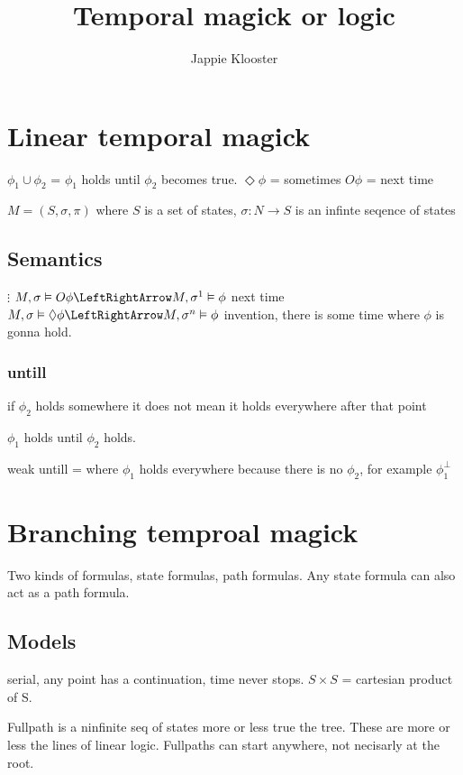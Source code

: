 \documentclass{article}
\begin{document}
\author{Jappie Klooster}
\title{Temporal magick or logic}
\maketitle
\section{Linear temporal magick}

$\phi_1\cup\phi_2$ = $\phi_1$ holds until $\phi_2$ becomes true.
$\Diamond\phi$ = sometimes
$O\phi$ = next time

$M=(S,\sigma, \pi)$ where $S$ is a set of states, $\sigma: N \to S$ is an
infinte seqence of states

\subsection{Semantics}
$\vdots$
$M,\sigma\vDash O\phi \LeftRightArrow M, \sigma^1 \vDash \phi$ next time
$M,\sigma\vDash \Diamond\phi \LeftRightArrow M, \sigma^n \vDash \phi$
invention, there is some time where $\phi$ is gonna hold.

\subsubsection{untill}
if $\phi_2$ holds somewhere it does not mean it holds everywhere after that
point

$\phi_1$ holds until $\phi_2$ holds.

weak untill = where $\phi_1$ holds everywhere because there is no
$\phi_2$, for example $\phi_1^{\bot}$

\section{Branching temproal magick}

Two kinds of formulas, state formulas, path formulas.
Any state formula can also act as a path formula.

\subsection{Models}
serial, any point has a continuation, time never stops.
$S \times S$ = cartesian product of S.

Fullpath is a ninfinite seq of states more or less true the tree.
These are more or less the lines of linear logic.
Fullpaths can start anywhere, not necisarly at the root.
\end{document}
